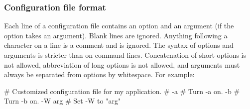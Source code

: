    \subsubsection{Configuration file format}

Each line of a configuration file contains an option and an argument
(if the option takes an argument). Blank lines are ignored.  Anything
following a \ccode{\#} character on a line is a comment and is
ignored. The syntax of options and arguments is stricter than on
command lines.  Concatenation of short options is not allowed,
abbreviation of long options is not allowed, and arguments must always
be separated from options by whitespace. For example:

\begin{cchunk}
   # Customized configuration file for my application.
   #
   -a             # Turn -a on.
   -b             # Turn -b on.
   -W arg         # Set -W to "arg"
\end{cchunk}



